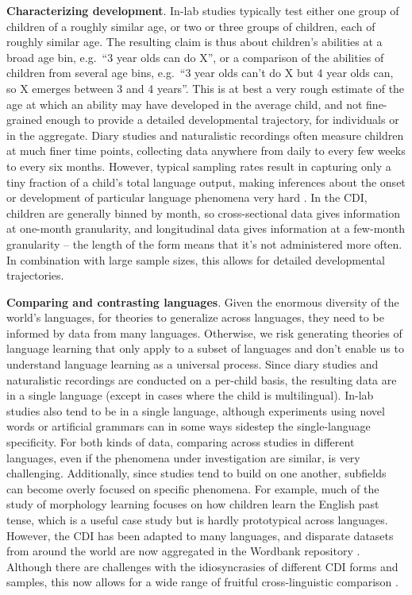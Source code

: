 \documentclass[
   11pt,
       ]{book}
\begin{document}
\textbf{Characterizing development}. In-lab studies typically test either one group of children of a roughly similar age, or two or three groups of children, each of roughly similar age. The resulting claim is thus about children's abilities at a broad age bin, e.g.~``3 year olds can do X'', or a comparison of the abilities of children from several age bins, e.g.~``3 year olds can't do X but 4 year olds can, so X emerges between 3 and 4 years''. This is at best a very rough estimate of the age at which an ability may have developed in the average child, and not fine-grained enough to provide a detailed developmental trajectory, for individuals or in the aggregate. Diary studies and naturalistic recordings often measure children at much finer time points, collecting data anywhere from daily to every few weeks to every six months. However, typical sampling rates result in capturing only a tiny fraction of a child's total language output, making inferences about the onset or development of particular language phenomena very hard \citep{tomasello2004}. In the CDI, children are generally binned by month, so cross-sectional data gives information at one-month granularity, and longitudinal data gives information at a few-month granularity -- the length of the form means that it's not administered more often. In combination with large sample sizes, this allows for detailed developmental trajectories.

\textbf{Comparing and contrasting languages}. Given the enormous diversity of the world's languages, for theories to generalize across languages, they need to be informed by data from many languages. Otherwise, we risk generating theories of language learning that only apply to a subset of languages and don't enable us to understand language learning as a universal process. Since diary studies and naturalistic recordings are conducted on a per-child basis, the resulting data are in a single language (except in cases where the child is multilingual). In-lab studies also tend to be in a single language, although experiments using novel words or artificial grammars can in some ways sidestep the single-language specificity. For both kinds of data, comparing across studies in different languages, even if the phenomena under investigation are similar, is very challenging. Additionally, since studies tend to build on one another, subfields can become overly focused on specific phenomena. For example, much of the study of morphology learning focuses on how children learn the English past tense, which is a useful case study but is hardly prototypical across languages. However, the CDI has been adapted to many languages, and disparate datasets from around the world are now aggregated in the Wordbank repository \citep{frank2017}. Although there are challenges with the idiosyncrasies of different CDI forms and samples, this now allows for a wide range of fruitful cross-linguistic comparison \citep{braginsky2019, frank2021}.
\end{document}
